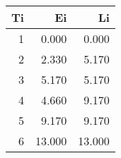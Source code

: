 \begin{tabular}{rrr}
\toprule
Ti & Ei & Li \\
\midrule
1 & 0.000 & 0.000 \\
2 & 2.330 & 5.170 \\
3 & 5.170 & 5.170 \\
4 & 4.660 & 9.170 \\
5 & 9.170 & 9.170 \\
6 & 13.000 & 13.000 \\
\bottomrule
\end{tabular}
